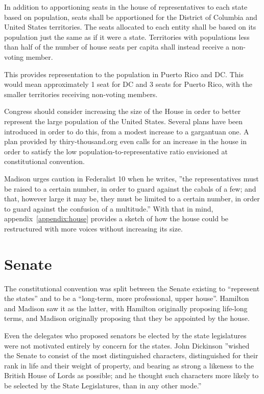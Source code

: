 \documentclass{article}
\begin{document}
\begin{quoting}
In addition to apportioning seats in the house of representatives to each state based on population, seats shall be apportioned for the District of Columbia and United States territories. The seats allocated to each entity shall be based on its population just the same as if it were a state. Territories with populations less than half of the number of house seats per capita shall instead receive a non-voting member.
\end{quoting}

This provides representation to the population in Puerto Rico and DC. This would mean approximately 1 seat for DC and 3 seats for Puerto Rico, with the smaller territories receiving non-voting members.

Congress should consider increasing the size of the House in order to better represent the large population of the United States. Several plans have been introduced in order to do this, from a modest increase to a gargantuan one\cite{Allen}. A plan provided by thiry-thousand.org even calls for an increase in the house in order to satisfy the low population-to-representative ratio envisioned at constitutional convention\cite{30000}.

Madison urges caution in Federalist 10 when he writes, ”the representatives must be raised to a certain number, in order to guard against the cabals of a few; and that, however large it may be, they must be limited to a certain number, in order to guard against the confusion of a multitude.”\cite{Federalist10} With that in mind, appendix~\ref{appendix:house} provides a sketch of how the house could be restructured with more voices without increasing its size.

\section{Senate}
\label{section:Senate}

The constitutional convention was split between the Senate existing to “represent the states” and to be a “long-term, more professional, upper house”. Hamilton and Madison saw it as the latter, with Hamilton originally proposing life-long terms, and Madison originally proposing that they be appointed by the house.

Even the delegates who proposed senators be elected by the state legislatures were not motivated entirely by concern for the states. John Dickinson ”wished the Senate to consist of the most distinguished characters, distinguished for their rank in life and their weight of property, and bearing as strong a likeness to the British House of Lords as possible; and he thought such characters more likely to be selected by the State Legislatures, than in any other mode.”\cite{Madison}
\end{document}
